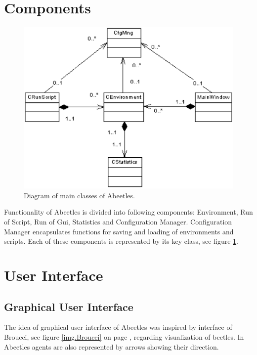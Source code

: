 \documentclass[a4paper,12pt]{report}
\begin{document}
\section {Components}

\begin{figure}
\begin{center}
  \includegraphics [scale=0.8]{images/ComponentModel.eps} %
  \caption{Diagram of main classes of Abeetles.}
  \label{img.ComponentModel}
\end{center}
\end{figure}

Functionality of Abeetles is divided into following components: Environment, Run of Script, Run of Gui, Statistics and Configuration Manager. Configuration Manager encapsulates functions for saving and loading of environments and scripts. Each of these components is  represented by its key class, see figure \ref {img.ComponentModel}.

\section {User Interface}
\subsection {Graphical User Interface}
The idea of graphical user interface of Abeetles was inspired by interface of Broucci, see figure \ref{img.Broucci} on page \pageref{img.Broucci}, regarding visualization of beetles. In Abeetles agents are also represented by arrows showing their direction. %
\end{document}
